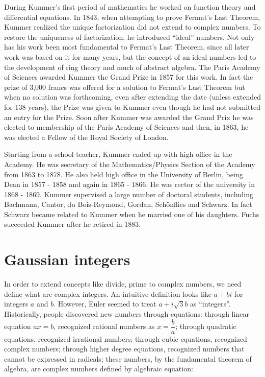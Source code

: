 \documentclass[b5paper]{article}
\begin{document}
\begin{mdframed}
During Kummer's first period of mathematics he worked on function theory and differential equations. In 1843, when attempting to prove Fermat's Last Theorem, Kummer realized the unique factorization did not extend to complex numbers. To restore the uniqueness of factorization, he introduced \enquote{ideal} numbers. Not only has his work been most fundamental to Fermat's Last Theorem, since all later work was based on it for many years, but the concept of an ideal numbers led to the development of ring theory and much of abstract algebra. The Paris Academy of Sciences awarded Kummer the Grand Prize in 1857 for this work. In fact the prize of 3,000 francs was offered for a solution to Fermat's Last Theorem but when no solution was forthcoming, even after extending the date (unless extended for 138 years), the Prize was given to Kummer even though he had not submitted an entry for the Prize. Soon after Kummer was awarded the Grand Prix he was elected to membership of the Paris Academy of Sciences and then, in 1863, he was elected a Fellow of the Royal Society of London.

Starting from a school teacher, Kummer ended up with high office in the Academy. He was secretary of the Mathematics/Physics Section of the Academy from 1863 to 1878. He also held high office in the University of Berlin, being Dean in 1857 - 1858 and again in 1865 - 1866. He was rector of the university in 1868 - 1869. Kummer supervised a large number of doctoral students, including Bachmann, Cantor, du Bois-Reymond, Gordan, Schönflies and Schwarz. In fact Schwarz became related to Kummer when he married one of his daughters. Fuchs succeeded Kummer after he retired in 1883.
\end{mdframed}

\section{Gaussian integers}

In order to extend concepts like divide, prime to complex numbers, we need define what are complex integers. An intuitive definition looks like $a + bi$ for integers $a$ and $b$. However, Euler seemed to treat $a + i\sqrt{3}b$ as \enquote{integers}. Historically, people discovered new numbers through equations: through linear equation $ax = b$, recognized rational numbers as $x = \dfrac{b}{a}$; through quadratic equations, recognized irrational numbers; through cubic equations, recognized complex numbers; through higher degree equations, recognized numbers that cannot be expressed in radicals; these numbers, by the fundamental theorem of algebra, are complex numbers defined by algebraic equation:
\end{document}
